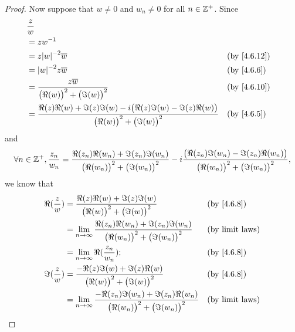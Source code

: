 \begin{proof}
  Now suppose that \(w \neq 0\) and \(w_n \neq 0\) for all \(n \in \mathbb{Z}^+\).
  Since
  \begin{align*}
     & \dfrac{z}{w}                                                                                                                                                \\
     & = z w^{-1}                                                                                                                                                  \\
     & = z \abs{w}^{-2} \overline{w}                                                                                                &  & \text{(by \cref{4.6.12})} \\
     & = \abs{w}^{-2} z \overline{w}                                                                                                &  & \text{(by \cref{4.6.6})}  \\
     & = \dfrac{z \overline{w}}{\big(\Re(w)\big)^2 + \big(\Im(w)\big)^2}                                                            &  & \text{(by \cref{4.6.10})} \\
     & = \dfrac{\Re(z) \Re(w) + \Im(z) \Im(w) - i \big(\Re(z) \Im(w) - \Im(z) \Re(w)\big)}{\big(\Re(w)\big)^2 + \big(\Im(w)\big)^2} &  & \text{(by \cref{4.6.5})}
  \end{align*}
  and
  \[
    \forall n \in \mathbb{Z}^+, \dfrac{z_n}{w_n} = \dfrac{\Re(z_n) \Re(w_n) + \Im(z_n) \Im(w_n)}{\big(\Re(w_n)\big)^2 + \big(\Im(w_n)\big)^2} - i \dfrac{\big(\Re(z_n) \Im(w_n) - \Im(z_n) \Re(w_n)\big)}{\big(\Re(w_n)\big)^2 + \big(\Im(w_n)\big)^2},
  \]
  we know that
  \begin{align*}
    \Re(\dfrac{z}{w}) & = \dfrac{\Re(z) \Re(w) + \Im(z) \Im(w)}{\big(\Re(w)\big)^2 + \big(\Im(w)\big)^2}                                   &  & \text{(by \cref{4.6.8})} \\
                      & = \lim_{n \to \infty} \dfrac{\Re(z_n) \Re(w_n) + \Im(z_n) \Im(w_n)}{\big(\Re(w_n)\big)^2 + \big(\Im(w_n)\big)^2}   &  & \text{(by limit laws)}   \\
                      & = \lim_{n \to \infty} \Re(\dfrac{z_n}{w_n});                                                                       &  & \text{(by \cref{4.6.8})} \\
    \Im(\dfrac{z}{w}) & = \dfrac{- \Re(z) \Im(w) + \Im(z) \Re(w)}{\big(\Re(w)\big)^2 + \big(\Im(w)\big)^2}                                 &  & \text{(by \cref{4.6.8})} \\
                      & = \lim_{n \to \infty} \dfrac{- \Re(z_n) \Im(w_n) + \Im(z_n) \Re(w_n)}{\big(\Re(w_n)\big)^2 + \big(\Im(w_n)\big)^2} &  & \text{(by limit laws)}   \\

\end{align*}
\end{proof}
